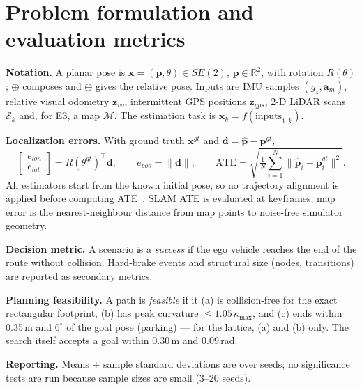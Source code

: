 \documentclass[11pt,a4paper]{article}
\begin{document}
\section{Problem formulation and evaluation metrics}\label{sec:formulation}
\textbf{Notation.} A planar pose is $\mathbf{x}=(\mathbf{p},\theta)\in SE(2)$, $\mathbf{p}\in\mathbb{R}^2$, with rotation $R(\theta)$; $\oplus$ composes and $\ominus$ gives the relative pose. Inputs are IMU samples $(g_z,\mathbf{a}_m)$, relative visual odometry $\mathbf{z}_{vo}$, intermittent GPS positions $\mathbf{z}_{gps}$, 2-D LiDAR scans $\mathcal{S}_k$ and, for E3, a map $\mathcal{M}$. The estimation task is $\hat{\mathbf{x}}_k=f(\text{inputs}_{1:k})$.

\textbf{Localization errors.} With ground truth $\mathbf{x}^{gt}$ and $\mathbf{d}=\hat{\mathbf{p}}-\mathbf{p}^{gt}$,
\begin{equation}
\begin{bmatrix}e_{lon}\\e_{lat}\end{bmatrix}=R(\theta^{gt})^{\!\top}\mathbf{d},\qquad e_{pos}=\|\mathbf{d}\|,\qquad
\mathrm{ATE}=\sqrt{\tfrac1N\sum_{i=1}^{N}\|\hat{\mathbf{p}}_i-\mathbf{p}^{gt}_i\|^2}.
\end{equation}
All estimators start from the known initial pose, so no trajectory alignment is applied before computing ATE~\cite{sturm12,zhang18}. SLAM ATE is evaluated at keyframes; map error is the nearest-neighbour distance from map points to noise-free simulator geometry.

\textbf{Decision metric.} A scenario is a \emph{success} if the ego vehicle reaches the end of the route without collision. Hard-brake events and structural size (nodes, transitions) are reported as secondary metrics.

\textbf{Planning feasibility.} A path is \emph{feasible} if it (a) is collision-free for the exact rectangular footprint, (b) has peak curvature $\le1.05\,\kappa_{\max}$, and (c) ends within 0.35\,m and $6^\circ$ of the goal pose (parking) --- for the lattice, (a) and (b) only. The search itself accepts a goal within 0.30\,m and 0.09\,rad.

\textbf{Reporting.} Means $\pm$ sample standard deviations are over seeds; no significance tests are run because sample sizes are small (3--20 seeds).
\end{document}
